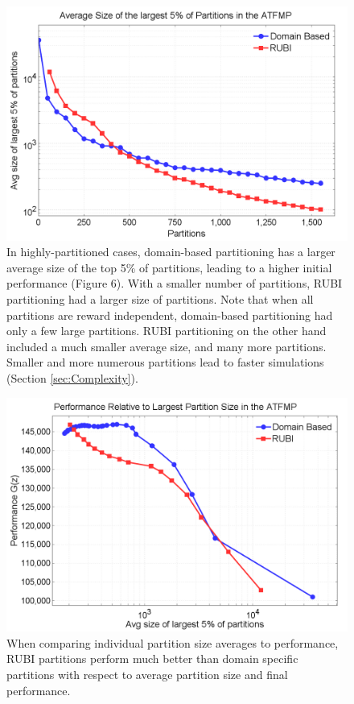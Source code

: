 \documentclass[smallcondensed]{svjour3}
\begin{document}
\begin{figure}
\centering
\includegraphics[width=.75\columnwidth]{OldvsNewAvgSize}
\caption{In highly-partitioned cases, domain-based partitioning has a larger average size of the top 5\% of partitions, leading to a higher initial performance (Figure 6). With a smaller number of partitions, RUBI partitioning had a larger size of partitions. Note that when all partitions are reward independent, domain-based partitioning had only a few large partitions. RUBI partitioning on the other hand included a much smaller average size, and many more partitions. Smaller and more numerous partitions lead to faster simulations (Section \ref{sec:Complexity}).}
\label{OldvsNewAvgSize}
\end{figure}

\begin{figure}
\centering
\includegraphics[width=.75\columnwidth]{ATFMPPerformancevsAvgSize}
\caption{When comparing individual partition size averages to performance, RUBI partitions perform much better than domain specific partitions with respect to average partition size and final performance.}
\label{ATFMPPerformancevsAvgSize}
\end{figure}
\end{document}
